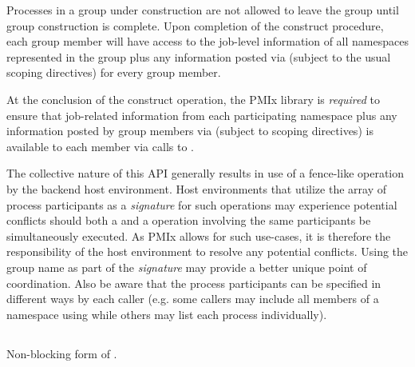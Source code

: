Processes in a group under construction are not allowed to leave the group until group construction is complete. Upon completion of the construct procedure, each group member will have access to the job-level information of all namespaces represented in the group plus any information posted via  (subject to the usual scoping directives) for every group member.

\adviceimplstart
At the conclusion of the construct operation, the \ac{PMIx} library is \emph{required} to ensure that job-related information from each participating namespace plus any information posted by group members via  (subject to scoping directives) is available to each member via calls to .
\adviceimplend

\advicermstart
The collective nature of this \ac{API} generally results in use of a fence-like operation by the backend host environment. Host environments that utilize the array of process participants as a \emph{signature} for such operations may experience potential conflicts should both a  and a  operation involving the same participants be simultaneously executed. As \ac{PMIx} allows for such use-cases, it is therefore the responsibility of the host environment to resolve any potential conflicts.  Using the group name as part of the \emph{signature} may provide a better unique point of coordination.  Also be aware that the process participants can be specified in different ways by each caller (e.g. some callers may include all members of a namespace using  while others may list each process individually).
\advicermend

\subsection{}

\summary

Non-blocking form of .

\format


